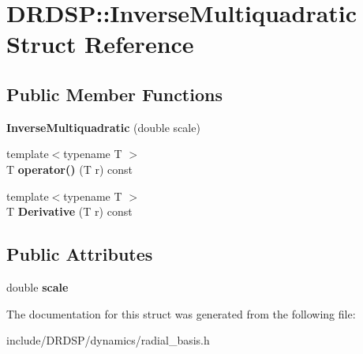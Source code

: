\hypertarget{struct_d_r_d_s_p_1_1_inverse_multiquadratic}{\section{D\-R\-D\-S\-P\-:\-:Inverse\-Multiquadratic Struct Reference}
\label{struct_d_r_d_s_p_1_1_inverse_multiquadratic}
}
\subsection*{Public Member Functions}
\begin{DoxyCompactItemize}
\item 
\hypertarget{struct_d_r_d_s_p_1_1_inverse_multiquadratic_a9de4a748cfda8c1bd8c0dfca408faed7}{{\bfseries Inverse\-Multiquadratic} (double scale)}\label{struct_d_r_d_s_p_1_1_inverse_multiquadratic_a9de4a748cfda8c1bd8c0dfca408faed7}

\item 
\hypertarget{struct_d_r_d_s_p_1_1_inverse_multiquadratic_a5ced1f6abf959202569facafb56be592}{{\footnotesize template$<$typename T $>$ }\\T {\bfseries operator()} (T r) const }\label{struct_d_r_d_s_p_1_1_inverse_multiquadratic_a5ced1f6abf959202569facafb56be592}

\item 
\hypertarget{struct_d_r_d_s_p_1_1_inverse_multiquadratic_abf5407eb574dbac34ad1cbd07f59be50}{{\footnotesize template$<$typename T $>$ }\\T {\bfseries Derivative} (T r) const }\label{struct_d_r_d_s_p_1_1_inverse_multiquadratic_abf5407eb574dbac34ad1cbd07f59be50}

\end{DoxyCompactItemize}
\subsection*{Public Attributes}
\begin{DoxyCompactItemize}
\item 
\hypertarget{struct_d_r_d_s_p_1_1_inverse_multiquadratic_a39009875f833958785889ac9373ad37c}{double {\bfseries scale}}\label{struct_d_r_d_s_p_1_1_inverse_multiquadratic_a39009875f833958785889ac9373ad37c}

\end{DoxyCompactItemize}


The documentation for this struct was generated from the following file\-:\begin{DoxyCompactItemize}
\item 
include/\-D\-R\-D\-S\-P/dynamics/radial\-\_\-basis.\-h\end{DoxyCompactItemize}
